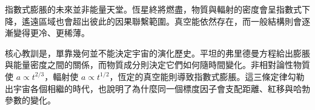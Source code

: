 指數式膨脹的未來並非能量天堂。恆星終將燃盡，物質與輻射的密度會呈指數式下降，遙遠區域也會超出彼此的因果聯繫範圍。真空能依然存在，而一般結構則會逐漸變得更冷、更稀薄。

\begin{classroomqa}
\end{classroomqa}

核心教訓是，單靠幾何並不能決定宇宙的演化歷史。平坦的弗里德曼方程給出膨脹與能量密度之間的關係，而物質成分則決定它們如何隨時間變化。非相對論性物質使 \(a\propto t^{2/3}\)，輻射使 \(a\propto t^{1/2}\)，恆定的真空能則導致指數式膨脹。這三條定律勾勒出宇宙各個相繼的時代，也說明了為什麼同一個標度因子會支配距離、紅移與哈勃參數的變化。
